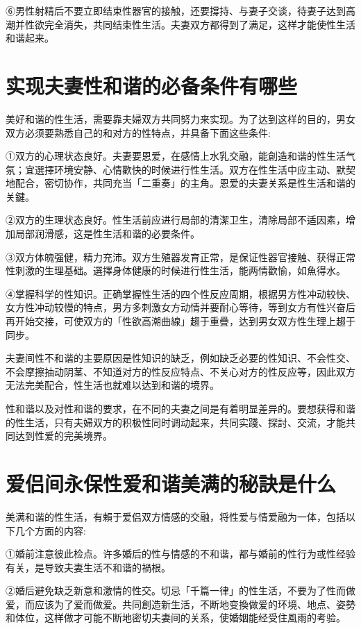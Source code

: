 \documentclass[12pt,UTF8]{ctexbook}
\begin{document}
⑥男性射精后不要立即结束性器官的接触，还要撐持、与妻子交谈，待妻子达到高潮并性欲完全消失，共同结束性生活。夫妻双方都得到了满足，这样才能使性生活和谐起来。

\section{实现夫妻性和谐的必备条件有哪些}

美好和谐的性生活，需要靠夫婦双方共同努力来实现。为了达到这样的目的，男女双方必须要熟悉自己的和对方的性特点，并具备下面这些条件:

①双方的心理状态良好。夫妻要恩爱，在感情上水乳交融，能創造和谐的性生活气氛；宜選擇环境安静、心情歡快的时候进行性生活。双方在性生活中应主动、默契地配合，密切协作，共同充当「二重奏」的主角。恩爱的夫妻关系是性生活和谐的关鍵。

②双方的生理状态良好。性生活前应进行局部的清潔卫生，清除局部不适因素，增加局部润滑感，这是性生活和谐的必要条件。

③双方体魄强健，精力充沛。双方生殖器发育正常，是保证性器官接触、获得正常性刺激的生理基础。選擇身体健康的时候进行性生活，能两情歡愉，如魚得水。

④掌握科学的性知识。正确掌握性生活的四个性反应周期，根据男方性冲动较快、女方性冲动较慢的特点，男方多刺激女方动情并要耐心等待，等到女方有性兴奋后再开始交接，可使双方的「性欲高潮曲線」趨于重疊，达到男女双方性生理上趨于同步。

夫妻间性不和谐的主要原因是性知识的缺乏，例如缺乏必要的性知识、不会性交、不会摩擦抽动阴茎、不知道对方的性反应特点、不关心对方的性反应等，因此双方无法完美配合，性生活也就难以达到和谐的境界。

性和谐以及对性和谐的要求，在不同的夫妻之间是有着明显差异的。要想获得和谐的性生活，只有夫婦双方的积极性同时调动起来，共同实踐、探討、交流，才能共同达到性爱的完美境界。

\section{爱侣间永保性爱和谐美满的秘訣是什么}

美满和谐的性生活，有賴于爱侣双方情感的交融，将性爱与情爱融为一体，包括以下几个方面的内容:

①婚前注意彼此检点。许多婚后的性与情感的不和谐，都与婚前的性行为或性经验有关，是导致夫妻生活不和谐的禍根。

②婚后避免缺乏新意和激情的性交。切忌「千篇一律」的性生活，不要为了性而做爱，而应该为了爱而做爱。共同創造新生活，不断地变換做爱的环境、地点、姿勢和体位，这样做才可能不断地密切夫妻间的关系，使婚姻能经受住風雨的考验。
\end{document}
